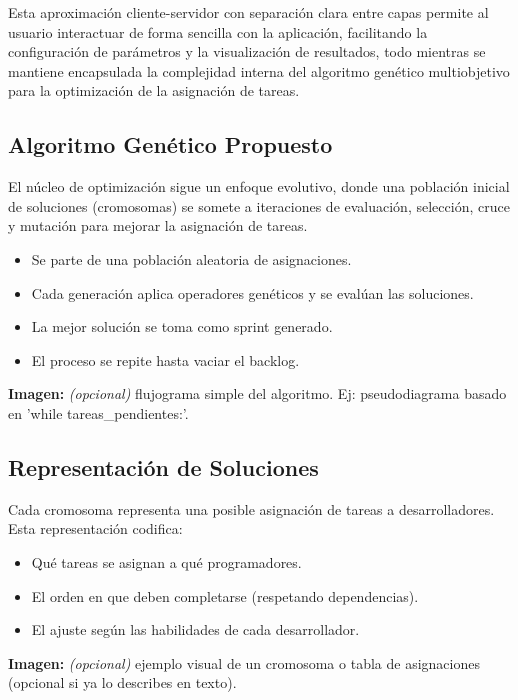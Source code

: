 Esta aproximación cliente-servidor con separación clara entre capas permite al usuario interactuar de forma sencilla con la aplicación, facilitando la configuración de parámetros y la visualización de resultados, todo mientras se mantiene encapsulada la complejidad interna del algoritmo genético multiobjetivo para la optimización de la asignación de tareas.

\subsection{Algoritmo Genético Propuesto}

El núcleo de optimización sigue un enfoque evolutivo, donde una población inicial de soluciones (cromosomas) se somete a iteraciones de evaluación, selección, cruce y mutación para mejorar la asignación de tareas.

\begin{itemize}
    \item Se parte de una población aleatoria de asignaciones.
    \item Cada generación aplica operadores genéticos y se evalúan las soluciones.
    \item La mejor solución se toma como sprint generado.
    \item El proceso se repite hasta vaciar el backlog.
\end{itemize}

\noindent\textbf{Imagen:} \textit{(opcional)} flujograma simple del algoritmo. Ej: pseudodiagrama basado en 'while tareas\_pendientes:'.

\subsection{Representación de Soluciones}

Cada cromosoma representa una posible asignación de tareas a desarrolladores. Esta representación codifica:

\begin{itemize}
    \item Qué tareas se asignan a qué programadores.
    \item El orden en que deben completarse (respetando dependencias).
    \item El ajuste según las habilidades de cada desarrollador.
\end{itemize}

\noindent\textbf{Imagen:} \textit{(opcional)} ejemplo visual de un cromosoma o tabla de asignaciones (opcional si ya lo describes en texto).

